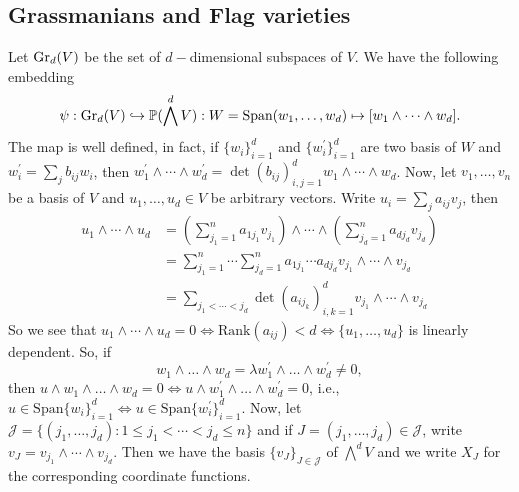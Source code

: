 \subsection{Grassmanians and Flag varieties}
Let $\text{Gr}_d(V)$ be the set of $d-$dimensional subspaces of $V$. We have the following embedding
\begin{equation}
    \psi: \text{Gr}_d(V)\hookrightarrow \mathbb{P}(\bigwedge^dV): W=\text{Span}(w_1,\dots, w_d)\mapsto [w_1\wedge\cdots\wedge w_d].
\end{equation}
The map is well defined, in fact, if $\{w_i\}_{i=1}^d$ and $\{w^\prime_i\}_{i=1}^d$ are two basis of $W$ and 
$w_i^\prime = \sum_j b_{ij}w_i$, then 
$w_1^\prime\wedge\cdots\wedge w_d^\prime = \det(b_{ij})_{i,j=1}^d w_1\wedge\cdots\wedge w_d$. Now, let 
$v_1,\dots, v_n$ be a basis of $V$ and $u_1,\dots,u_d\in V$ be arbitrary vectors. Write 
$u_i = \sum_ja_{ij}v_j$, then 
\begin{equation}
    \begin{split}
        u_1\wedge\cdots\wedge u_d &= (\sum_{j_1=1}^na_{1j_1}v_{j_1})\wedge\cdots\wedge(\sum_{j_d=1}^na_{dj_d}v_{j_d})\\
        &=\sum_{j_1=1}^n\cdots\sum_{j_d=1}^n a_{1j_1}\cdots a_{dj_d}v_{j_1}\wedge\cdots\wedge v_{j_d}\\
        &=\sum_{j_1<\cdots<j_d}\det(a_{ij_k})_{i,k=1}^d v_{j_1}\wedge\cdots\wedge v_{j_d}
    \end{split}
\end{equation}
So we see that $u_1\wedge\cdots\wedge u_d=0\iff \text{Rank}(a_{ij})<d\iff \{u_1,\dots, u_d\}$ is linearly dependent. So, if 
\begin{equation}
    w_1\wedge\dots\wedge w_d = \lambda w_1^\prime\wedge\dots\wedge w_d^\prime \neq0,
\end{equation}
then $u\wedge w_1\wedge\dots\wedge w_d=0\iff  u\wedge w_1^\prime\wedge\dots\wedge w_d^\prime=0$, i.e., 
$u\in\text{Span}\{w_i\}_{i=1}^d\iff u\in\text{Span}\{w_i^\prime\}_{i=1}^d$. Now, let 
$\mathcal{J}=\{(j_1,\dots, j_d):1\leq j_1<\cdots<j_d\leq n\}$ and if $J=(j_1,\dots, j_d)\in\mathcal{J}$, write 
$v_J = v_{j_1}\wedge\cdots\wedge v_{j_d}$. Then we have the basis $\{v_J\}_{J\in\mathcal{J}}$ of $\bigwedge^dV$ and we 
write $X_J$ for the corresponding coordinate functions.\par 

